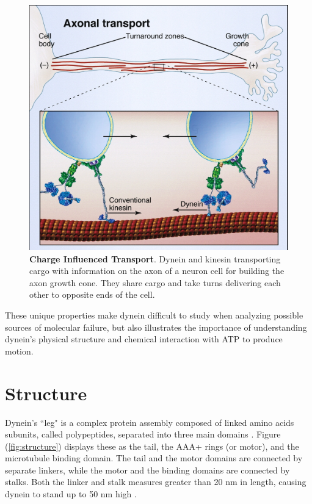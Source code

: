 \begin{figure}[H]
	\centering
	\includegraphics[width=0.6\columnwidth]{Figures/retrograde_transport.jpg}
	\caption[Charge Influenced Transport]{\textbf{Charge Influenced Transport}. Dynein and kinesin transporting cargo with information on the axon of a neuron cell for building the axon growth cone. They share cargo and take turns delivering each other to opposite ends of the cell. \cite{Vale2003molecular}}
	\label{fig:transport}
\end{figure}

These unique properties make dynein difficult to study when analyzing possible sources of molecular failure, but also illustrates the importance of understanding dynein's physical structure and chemical interaction with ATP to produce motion.

\newpage
\section{Structure}

Dynein's ``leg" is a complex protein assembly composed of linked amino acids subunits, called polypeptides, separated into three main domains \cite{Burgess2003}. Figure (\ref{fig:structure}) displays these as the tail, the AAA+ rings (or motor), and the microtubule binding domain. The tail and the motor domains are connected by separate linkers, while the motor and the binding domains are connected by stalks. Both the linker and stalk measures greater than 20 nm in length, causing dynein to stand up to 50 nm high \cite{Burgess2003}. 


